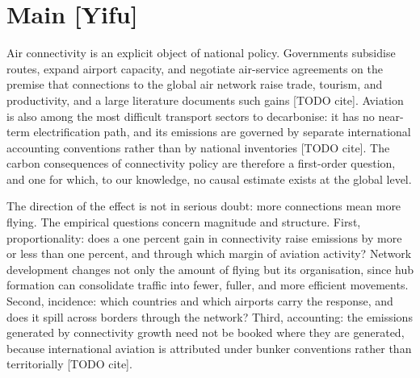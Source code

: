 \section*{Main [Yifu]}
Air connectivity is an explicit object of national policy. Governments
subsidise routes, expand airport capacity, and negotiate air-service
agreements on the premise that connections to the global air network raise
trade, tourism, and productivity, and a large literature documents such
gains [TODO cite]. Aviation is also among the most difficult transport
sectors to decarbonise: it has no near-term electrification path, and its
emissions are governed by separate international accounting conventions
rather than by national inventories [TODO cite]. The carbon consequences of
connectivity policy are therefore a first-order question, and one for
which, to our knowledge, no causal estimate exists at the global level.

The direction of the effect is not in serious doubt: more connections mean
more flying. The empirical questions concern magnitude and structure.
First, proportionality: does a one percent gain in connectivity raise
emissions by more or less than one percent, and through which margin of
aviation activity? Network development changes not only the amount of
flying but its organisation, since hub formation can consolidate traffic
into fewer, fuller, and more efficient movements. Second, incidence: which
countries and which airports carry the response, and does it spill across
borders through the network? Third, accounting: the emissions generated by
connectivity growth need not be booked where they are generated, because
international aviation is attributed under bunker conventions rather than
territorially [TODO cite].


